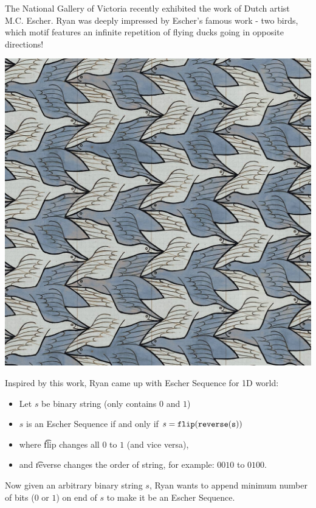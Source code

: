 The National Gallery of Victoria recently exhibited the work of Dutch artist M.C. Escher.
Ryan was deeply impressed by Escher's famous work - two birds,
which motif features an infinite repetition of flying ducks going in opposite directions!

\begin{center}
  \includegraphics[scale=0.2, natwidth=1200, natheight=1200]{two-birds.jpg}
\end{center}

Inspired by this work, Ryan came up with Escher Sequence for 1D world:

\begin{itemize}
  \item Let $s$ be binary string (only contains $0$ and $1$)
  \item $s$ is an Escher Sequence if and only if $s = \t{flip(reverse(s))}$
  \item where \t{flip} changes all $0$ to $1$ (and vice versa),
  \item and \t{reverse} changes the order of string, for example: $0010$ to $0100$.
\end{itemize}

Now given an arbitrary binary string $s$,
Ryan wants to append minimum number of bits ($0$ or $1$) on end of $s$ to make it be an Escher Sequence.
